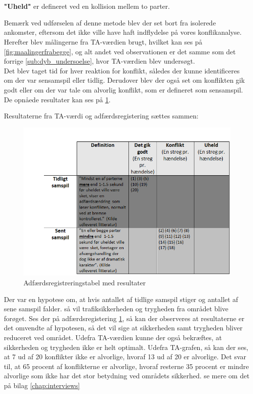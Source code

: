 \\\\
\textbf{"Uheld"} er defineret ved en kollision mellem to parter.

Bemærk ved udførselen af denne metode blev der set bort fra isolerede ankomster, eftersom det ikke ville have haft indflydelse på vores konflikanalyse. Herefter blev målingerne fra TA-værdien brugt, hvilket kan ses på \cref{fig:maalingerfrabegge}, og alt andet ved observationen er det samme som det forrige \cref{sub:dyb_undersoelse}, hvor TA-værdien blev undersøgt.
\\
Det blev taget tid for hver reaktion for konflikt, således der kunne identificeres om der var sensamspil eller tidlig. Derudover blev der også set om konflikten gik godt eller om der var tale om alvorlig konflikt, som er defineret som sensamspil. De opnåede resultater kan ses på \cref{fig:adfregtabelresult}.


Resultaterne fra TA-værdi og adfærdsregistering sættes sammen:
\begin{figure}[htbp]
  \label{fig:adfregtabelresult}
  \centering
  \begin{adjustbox}{max width=\textwidth}
    \includegraphics{billederogfigur/obstabelresult.png} %
 \end{adjustbox}
  \caption{Adfærdsregistreringstabel med resultater}
\end{figure}

Der var en hypotese om, at hvis antallet af tidlige samspil stiger og antallet af sene samspil falder. så vil trafiksikkerheden og trygheden fra området blive forøget. Ses der på adfærdsregistering \cref{fig:adfregtabelresult}, så kan der observeres at resultaterne er det omvendte af hypotesen, så det vil sige at sikkerheden samt trygheden bliver reduceret ved området. Udefra TA-værdien kunne der også bekræftes, at sikkerheden og trygheden ikke er helt optimalt.
Udefra TA-grafen, så kan der ses, at 7 ud af 20 konflikter ikke er alvorlige, hvoraf 13 ud af 20 er alvorlige. Det svar til, at 65 procent af konflikterne er alvorlige, hvoraf resterne 35 procent er mindre alvorlige som ikke har det stor betydning ved områdets sikkerhed.
se mere om det på bilag \cref{chap:interviews}

